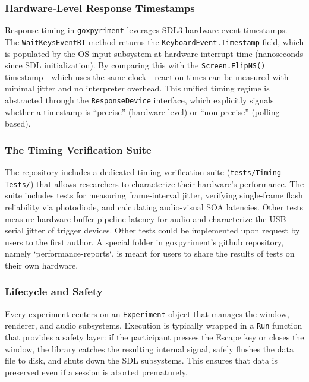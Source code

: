 \documentclass[jou,a4paper]{apa7}
\begin{document}
\subsubsection{Hardware-Level Response Timestamps}\label{hardware-timestamps}

Response timing in \texttt{goxpyriment} leverages SDL3 hardware event
timestamps. The \texttt{WaitKeysEventRT} method returns the
\texttt{KeyboardEvent.Timestamp} field, which is populated by the OS input
subsystem at hardware-interrupt time (nanoseconds since SDL initialization). By
comparing this with the \texttt{Screen.FlipNS()} timestamp—which uses the same
clock—reaction times can be measured with minimal jitter and no interpreter
overhead. This unified timing regime is abstracted through the
\texttt{ResponseDevice} interface, which explicitly signals whether a timestamp
is ``precise'' (hardware-level) or ``non-precise'' (polling-based).

\subsubsection{The Timing Verification Suite}\label{timing-verification}

The repository includes a dedicated timing verification suite
(\texttt{tests/Timing-Tests/}) that allows researchers to characterize
their hardware's performance. The suite includes tests for measuring
frame-interval jitter, verifying single-frame flash reliability via
photodiode, and calculating audio-visual SOA latencies. Other tests
measure hardware-buffer pipeline latency for audio and characterize
the USB-serial jitter of trigger devices. Other tests could be
implemented upon request by users to the first author.  A special
folder in goxpyriment's github repository, namely
`performance-reports`, is meant for users to share the results of tests
on their own hardware.


\subsubsection{Lifecycle and Safety}\label{lifecycle-safety}

Every experiment centers on an \texttt{Experiment} object that manages the
window, renderer, and audio subsystems. Execution is typically wrapped in a
\texttt{Run} function that provides a safety layer: if the participant presses
the Escape key or closes the window, the library catches the resulting internal
signal, safely flushes the data file to disk, and shuts down the SDL
subsystems. This ensures that data is preserved even if a session is aborted
prematurely.
\end{document}
